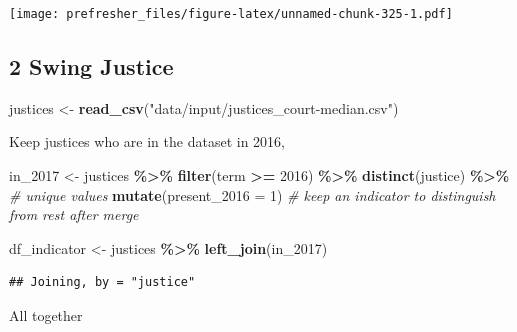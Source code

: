 \documentclass[
]{book}
\newenvironment{Shaded}{\begin{snugshade}}{\end{snugshade}}
\newcommand{\CommentTok}[1]{\textcolor[rgb]{0.56,0.35,0.01}{\textit{#1}}}
\newcommand{\DataTypeTok}[1]{\textcolor[rgb]{0.13,0.29,0.53}{#1}}
\newcommand{\DecValTok}[1]{\textcolor[rgb]{0.00,0.00,0.81}{#1}}
\newcommand{\KeywordTok}[1]{\textcolor[rgb]{0.13,0.29,0.53}{\textbf{#1}}}
\newcommand{\NormalTok}[1]{#1}
\newcommand{\OperatorTok}[1]{\textcolor[rgb]{0.81,0.36,0.00}{\textbf{#1}}}
\newcommand{\StringTok}[1]{\textcolor[rgb]{0.31,0.60,0.02}{#1}}
\theoremstyle{definition}
\theoremstyle{definition}
\theoremstyle{definition}
\theoremstyle{remark}
\begin{document}
\texttt{[image: prefresher\_files/figure-latex/unnamed-chunk-325-1.pdf]}

\hypertarget{swing-justice}{%
\subsection*{2 Swing Justice}\label{swing-justice}}

\begin{Shaded}
\begin{Highlighting}[]
\NormalTok{justices <{-}}\StringTok{ }\KeywordTok{read\_csv}\NormalTok{(}\StringTok{"data/input/justices\_court{-}median.csv"}\NormalTok{)}
\end{Highlighting}
\end{Shaded}

Keep justices who are in the dataset in 2016,

\begin{Shaded}
\begin{Highlighting}[]
\NormalTok{in\_}\DecValTok{2017}\NormalTok{ <{-}}\StringTok{ }\NormalTok{justices }\OperatorTok{\%>\%}
\StringTok{  }\KeywordTok{filter}\NormalTok{(term }\OperatorTok{>=}\StringTok{ }\DecValTok{2016}\NormalTok{) }\OperatorTok{\%>\%}
\StringTok{  }\KeywordTok{distinct}\NormalTok{(justice) }\OperatorTok{\%>\%}\StringTok{ }\CommentTok{\# unique values}
\StringTok{  }\KeywordTok{mutate}\NormalTok{(}\DataTypeTok{present\_2016 =} \DecValTok{1}\NormalTok{) }\CommentTok{\# keep an indicator to distinguish from rest after merge}

\NormalTok{df\_indicator <{-}}\StringTok{ }\NormalTok{justices }\OperatorTok{\%>\%}
\StringTok{  }\KeywordTok{left\_join}\NormalTok{(in\_}\DecValTok{2017}\NormalTok{)}
\end{Highlighting}
\end{Shaded}

\begin{verbatim}
## Joining, by = "justice"
\end{verbatim}

All together
\end{document}
